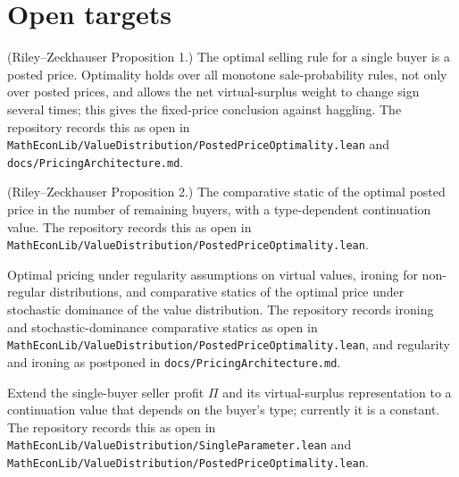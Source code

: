 \section{Open targets}

\begin{theorem}\label{thm:open.riley_zeckhauser_prop1}
(Riley--Zeckhauser Proposition 1.) The optimal selling rule for a single buyer is a posted price. Optimality holds over all monotone sale-probability rules, not only over posted prices, and allows the net virtual-surplus weight to change sign several times; this gives the fixed-price conclusion against haggling. The repository records this as open in \texttt{MathEconLib/ValueDistribution/PostedPriceOptimality.lean} and \texttt{docs/PricingArchitecture.md}.
\end{theorem}

\begin{theorem}\label{thm:open.riley_zeckhauser_prop2}
(Riley--Zeckhauser Proposition 2.) The comparative static of the optimal posted price in the number of remaining buyers, with a type-dependent continuation value. The repository records this as open in \texttt{MathEconLib/ValueDistribution/PostedPriceOptimality.lean}.
\end{theorem}

\begin{theorem}\label{thm:open.regularity_ironing_dominance}
Optimal pricing under regularity assumptions on virtual values, ironing for non-regular distributions, and comparative statics of the optimal price under stochastic dominance of the value distribution. The repository records ironing and stochastic-dominance comparative statics as open in \texttt{MathEconLib/ValueDistribution/PostedPriceOptimality.lean}, and regularity and ironing as postponed in \texttt{docs/PricingArchitecture.md}.
\end{theorem}

\begin{theorem}\label{thm:open.type_dependent_continuation_value}
Extend the single-buyer seller profit $\Pi$ and its virtual-surplus representation to a continuation value that depends on the buyer's type; currently it is a constant. The repository records this as open in \texttt{MathEconLib/ValueDistribution/SingleParameter.lean} and \texttt{MathEconLib/ValueDistribution/PostedPriceOptimality.lean}.
\end{theorem}
